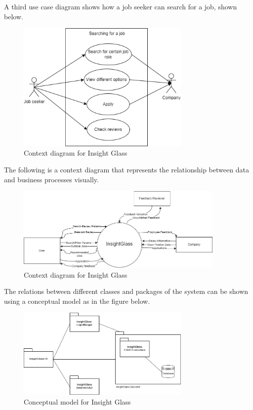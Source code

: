 \documentclass[titlepage]{article}
\begin{document}
A third use case diagram shows how a job seeker can search for a job, shown below.
\begin{figure}[H]
    \centering
    \includegraphics[width=0.75\textwidth]{Images/Searching.png}
    \caption{Context diagram for Insight Glass}
\end{figure}
The following is a context diagram that represents the relationship between
data and business processes visually.
\begin{figure}[H]
    \centering
    \includegraphics[width=0.9\textwidth]{Images/context_diagram.png}
    \caption{Context diagram for Insight Glass}
\end{figure}
The relations between different classes and packages of the system can be shown using a conceptual model as in the figure below.
\begin{figure}[H]
    \centering
    \includegraphics[width=0.75\textwidth]{Images/Conceptual.png}
    \caption{Conceptual model for Insight Glass}
\end{figure}
\end{document}
